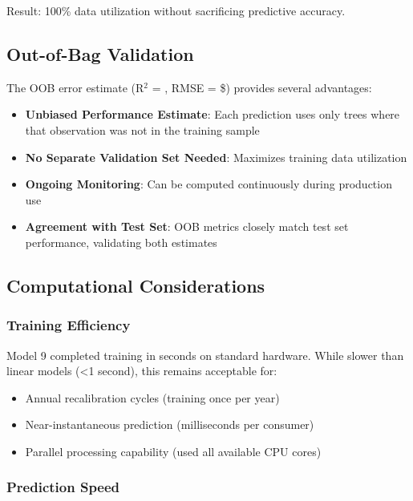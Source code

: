 Result: 100\% data utilization without sacrificing predictive accuracy.

\subsection{Out-of-Bag Validation}

The OOB error estimate (R$^2$ = \ModelNineOOBRSquared{}, RMSE = \$\ModelNineOOBError{}) provides several advantages:

\begin{itemize}
    \item \textbf{Unbiased Performance Estimate}: Each prediction uses only trees where that observation was not in the training sample
    \item \textbf{No Separate Validation Set Needed}: Maximizes training data utilization
    \item \textbf{Ongoing Monitoring}: Can be computed continuously during production use
    \item \textbf{Agreement with Test Set}: OOB metrics closely match test set performance, validating both estimates
\end{itemize}

\subsection{Computational Considerations}

\subsubsection{Training Efficiency}

Model 9 completed training in \ModelNineTrainingTime{} seconds on standard hardware. While slower than linear models (<1 second), this remains acceptable for:

\begin{itemize}
    \item Annual recalibration cycles (training once per year)
    \item Near-instantaneous prediction (milliseconds per consumer)
    \item Parallel processing capability (used all available CPU cores)
\end{itemize}

\subsubsection{Prediction Speed}

